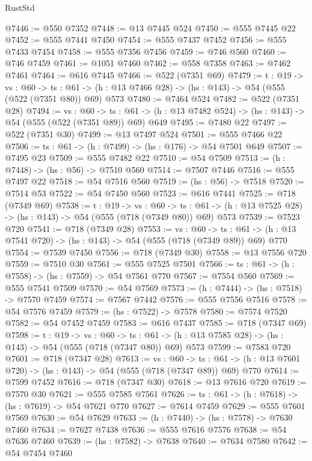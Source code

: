 \begin{lexlean}{RustStd}
\begin{coremodule}
@7446 := @550 @7352
@7448 := @13 @7445 @524
@7450 := @555 @7445 @22
@7452 := @555 @7441 @7450
@7454 := @555 @7437 @7452
@7456 := @555 @7433 @7454
@7458 := @555 @7356 @7456
@7459 := @746 @560
@7460 := @746 @7459
@7461 := @1051 @7460
@7462 := @558 @7358
@7463 := @7462 @7461
@7464 := @616 @7445
@7466 := @522 (@7351 @69)
@7479 := {t : @19} ->
  {vs : @60} ->
  {ts : @61} -> (h : @13 @7466 @28) -> (hs : @143) -> @54 (@555 (@522 (@7351 @80)) @69) @573
@7480 := @7464 @524
@7482 := @522 (@7351 @28)
@7494 := {vs : @60} ->
  {ts : @61} -> (h : @13 @7482 @524) -> (hs : @143) -> @54 (@555 (@522 (@7351 @89)) @69) @649
@7495 := @7480 @22
@7497 := @522 (@7351 @30)
@7499 := @13 @7497 @524
@7501 := @555 @7466 @22
@7506 := {ts : @61} -> (h : @7499) -> (hs : @176) -> @54 @7501 @649
@7507 := @7495 @23
@7509 := @555 @7482 @22
@7510 := @54 @7509
@7513 := (h : @7448) -> (hs : @56) -> @7510 @560
@7514 := @7507 @7446
@7516 := @555 @7497 @22
@7518 := @54 @7516 @560
@7519 := (hs : @56) -> @7518
@7520 := @7514 @53
@7522 := @54 @7450 @560
@7523 := @616 @7441
@7525 := @718 (@7349 @69)
@7538 := {t : @19} ->
  {vs : @60} ->
  {ts : @61} -> (h : @13 @7525 @28) -> (hs : @143) -> @54 (@555 (@718 (@7349 @80)) @69) @573
@7539 := @7523 @720
@7541 := @718 (@7349 @28)
@7553 := {vs : @60} ->
  {ts : @61} -> (h : @13 @7541 @720) -> (hs : @143) -> @54 (@555 (@718 (@7349 @89)) @69) @770
@7554 := @7539 @7450
@7556 := @718 (@7349 @30)
@7558 := @13 @7556 @720
@7559 := @7510 @30
@7561 := @555 @7525 @7501
@7566 := {ts : @61} -> (h : @7558) -> (hs : @7559) -> @54 @7561 @770
@7567 := @7554 @560
@7569 := @555 @7541 @7509
@7570 := @54 @7569
@7573 := (h : @7444) -> (hs : @7518) -> @7570 @7459
@7574 := @7567 @7442
@7576 := @555 @7556 @7516
@7578 := @54 @7576 @7459
@7579 := (hs : @7522) -> @7578
@7580 := @7574 @7520
@7582 := @54 @7452 @7459
@7583 := @616 @7437
@7585 := @718 (@7347 @69)
@7598 := {t : @19} ->
  {vs : @60} ->
  {ts : @61} -> (h : @13 @7585 @28) -> (hs : @143) -> @54 (@555 (@718 (@7347 @80)) @69) @573
@7599 := @7583 @720
@7601 := @718 (@7347 @28)
@7613 := {vs : @60} ->
  {ts : @61} -> (h : @13 @7601 @720) -> (hs : @143) -> @54 (@555 (@718 (@7347 @89)) @69) @770
@7614 := @7599 @7452
@7616 := @718 (@7347 @30)
@7618 := @13 @7616 @720
@7619 := @7570 @30
@7621 := @555 @7585 @7561
@7626 := {ts : @61} -> (h : @7618) -> (hs : @7619) -> @54 @7621 @770
@7627 := @7614 @7459
@7629 := @555 @7601 @7569
@7630 := @54 @7629
@7633 := (h : @7440) -> (hs : @7578) -> @7630 @7460
@7634 := @7627 @7438
@7636 := @555 @7616 @7576
@7638 := @54 @7636 @7460
@7639 := (hs : @7582) -> @7638
@7640 := @7634 @7580
@7642 := @54 @7454 @7460

\end{coremodule}
\end{lexlean}
